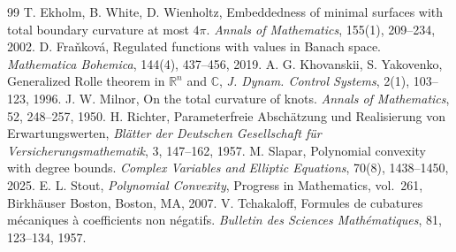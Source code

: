 \documentclass[10pt,a4paper]{amsart}
\numberwithin{equation}{section}
\begin{document}
\begin{thebibliography}{99}
 T. Ekholm, B. White, D. Wienholtz, Embeddedness of minimal surfaces with total boundary curvature at most $4\pi$. \textit{Annals of Mathematics}, 155(1), 209--234, 2002.
 D. Fra\v nkov\'a, Regulated functions with values in Banach space. \textit{Mathematica Bohemica}, 144(4), 437--456, 2019.
 A. G. Khovanskii, S. Yakovenko, Generalized Rolle theorem in $\mathbb{R}^n$ and $\mathbb{C}$, \textit{J. Dynam. Control Systems}, 2(1), 103--123, 1996.
 J. W. Milnor, On the total curvature of knots. \textit{Annals of Mathematics}, 52, 248--257, 1950.
 H. Richter, Parameterfreie Absch\"atzung und Realisierung von Erwartungswerten, \textit{Bl\"atter der Deutschen Gesellschaft f\"ur Versicherungsmathematik}, 3, 147--162, 1957.
 M. Slapar, Polynomial convexity with degree bounds. \textit{Complex Variables and Elliptic Equations}, 70(8), 1438--1450, 2025.
 E. L. Stout, \emph{Polynomial Convexity}, Progress in Mathematics, vol.~261, Birkh\"auser Boston, Boston, MA, 2007.
 V. Tchakaloff, Formules de cubatures m\'ecaniques \`a coefficients non n\'egatifs. \textit{Bulletin des Sciences Math\'ematiques}, 81, 123--134, 1957.
\end{thebibliography}
\end{document}
